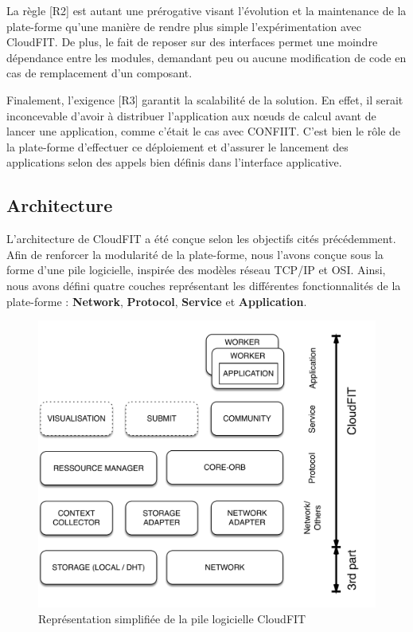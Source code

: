 La règle [R2] est autant une prérogative visant l'évolution et la maintenance de la plate-forme qu'une manière de rendre plus simple l'expérimentation avec CloudFIT. De plus, le fait de reposer sur des interfaces permet une moindre dépendance entre les modules, demandant peu ou aucune modification de code en cas de remplacement d'un composant. 

Finalement, l'exigence [R3] garantit la scalabilité de la solution. En effet, il serait inconcevable d'avoir à distribuer l'application aux n{\oe}uds de calcul avant de lancer une application, comme c'était le cas avec CONFIIT. C'est bien le rôle de la plate-forme d'effectuer ce déploiement et d'assurer le lancement des applications selon des appels bien définis dans l'interface applicative. 

\subsection{Architecture}

L'architecture de CloudFIT a été conçue selon les objectifs cités précédemment. Afin de renforcer la modularité de la plate-forme, nous l'avons conçue sous la forme d'une pile logicielle, inspirée des modèles réseau TCP/IP et OSI. Ainsi, nous avons défini quatre couches représentant les différentes fonctionnalités de la plate-forme : \textbf{Network}, \textbf{Protocol}, \textbf{Service} et \textbf{Application}.

\begin{figure}
	\centering
		\includegraphics[width=0.65\linewidth]{img/CloudFITstack}
		\caption{Représentation simplifiée de la pile logicielle CloudFIT}\label{fig:cloudFitStack}
\end{figure}

